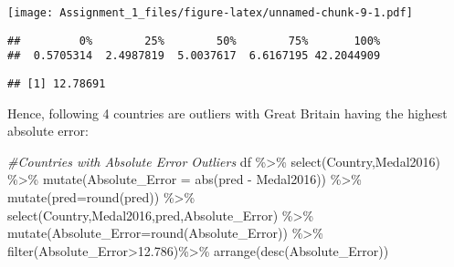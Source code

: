 \documentclass[
]{article}
\newenvironment{Shaded}{\begin{snugshade}}{\end{snugshade}}
\newcommand{\AttributeTok}[1]{\textcolor[rgb]{0.77,0.63,0.00}{#1}}
\newcommand{\CommentTok}[1]{\textcolor[rgb]{0.56,0.35,0.01}{\textit{#1}}}
\newcommand{\FloatTok}[1]{\textcolor[rgb]{0.00,0.00,0.81}{#1}}
\newcommand{\FunctionTok}[1]{\textcolor[rgb]{0.00,0.00,0.00}{#1}}
\newcommand{\NormalTok}[1]{#1}
\newcommand{\SpecialCharTok}[1]{\textcolor[rgb]{0.00,0.00,0.00}{#1}}
\begin{document}
\texttt{[image: Assignment\_1\_files/figure-latex/unnamed-chunk-9-1.pdf]}

\begin{Shaded}
\end{Shaded}

\begin{verbatim}
##         0%        25%        50%        75%       100% 
##  0.5705314  2.4987819  5.0037617  6.6167195 42.2044909
\end{verbatim}

\begin{Shaded}
\end{Shaded}

\begin{verbatim}
## [1] 12.78691
\end{verbatim}

Hence, following 4 countries are outliers with Great Britain having the
highest absolute error:

\begin{Shaded}
\begin{Highlighting}[]
\CommentTok{\#Countries with Absolute Error Outliers}
\NormalTok{df }\SpecialCharTok{\%\textgreater{}\%} 
  \FunctionTok{select}\NormalTok{(Country,Medal2016) }\SpecialCharTok{\%\textgreater{}\%}
  \FunctionTok{mutate}\NormalTok{(}\AttributeTok{Absolute\_Error =} \FunctionTok{abs}\NormalTok{(pred }\SpecialCharTok{{-}}\NormalTok{ Medal2016)) }\SpecialCharTok{\%\textgreater{}\%}
  \FunctionTok{mutate}\NormalTok{(}\AttributeTok{pred=}\FunctionTok{round}\NormalTok{(pred)) }\SpecialCharTok{\%\textgreater{}\%}
  \FunctionTok{select}\NormalTok{(Country,Medal2016,pred,Absolute\_Error) }\SpecialCharTok{\%\textgreater{}\%}
  \FunctionTok{mutate}\NormalTok{(}\AttributeTok{Absolute\_Error=}\FunctionTok{round}\NormalTok{(Absolute\_Error)) }\SpecialCharTok{\%\textgreater{}\%}
  \FunctionTok{filter}\NormalTok{(Absolute\_Error}\SpecialCharTok{\textgreater{}}\FloatTok{12.786}\NormalTok{)}\SpecialCharTok{\%\textgreater{}\%}
  \FunctionTok{arrange}\NormalTok{(}\FunctionTok{desc}\NormalTok{(Absolute\_Error))}
\end{Highlighting}
\end{Shaded}
\end{document}
